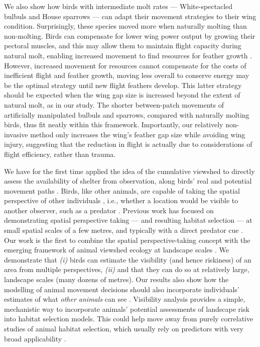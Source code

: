 \begin{refsection}
We also show how birds with intermediate molt rates --- White-spectacled bulbuls and House sparrows --- can adapt their movement strategies to their wing condition.
Surprisingly, these species moved more when naturally molting than non-molting.
Birds can compensate for lower wing power output by growing their pectoral muscles, and this may allow them to maintain flight capacity during natural molt, enabling increased movement to find resources for feather growth \cite{chai1997,swaddle1997}.
However, increased movement for resources cannot compensate for the costs of inefficient flight and feather growth, moving less overall to conserve energy may be the optimal strategy until new flight feathers develop.
This latter strategy should be expected when the wing gap size is increased beyond the extent of natural molt, as in our study.
The shorter between-patch movements of artificially manipulated bulbuls and sparrows, compared with naturally molting birds, thus fit neatly within this framework.
Importantly, our relatively non-invasive method only increases the wing's feather gap size while avoiding wing injury, suggesting that the reduction in flight is actually due to considerations of flight efficiency, rather than trauma.

We have for the first time applied the idea of the cumulative viewshed to directly assess the availability of shelter from observation, along birds' real and potential movement paths \cite{olsoy2015}.
Birds, like other animals, are capable of taking the spatial perspective of other individuals \cite{emery2000,krams2001,watve2002,davidson2016}, i.e., whether a location would be visible to another observer, such as a predator \citep{watve2002,olsoy2015}.
Previous work has focused on demonstrating spatial perspective taking --- and resulting habitat selection --- at small spatial scales of a few metres, and typically with a direct predator cue \cite{krams2001,watve2002}.
Our work is the first to combine the spatial perspective-taking concept with the emerging framework of animal viewshed ecology at landscape scales \cite{aben2018,aben2021}.
We demonstrate that \textit{(i)} birds can estimate the visibility (and hence riskiness) of an area from multiple perspectives, \textit{(ii)} and that they can do so at relatively large, landscape scales (many dozens of metres).
Our results also show how the modelling of animal movement decisions should also incorporate individuals' estimates of what \textit{other animals} can see \cite{emery2000}.
Visibility analysis provides a simple, mechanistic way to incorporate animals' potential assessments of landscape risk into habitat selection models.
This could help move away from purely correlative studies of animal habitat selection, which usually rely on predictors with very broad applicability \cite{pettorelli2011}.


\end{refsection}
